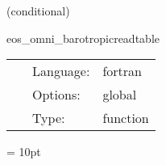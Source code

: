 \vspace{5mm}

   (conditional) 

\hspace{5mm} eos\_omni\_barotropicreadtable 

\hspace{5mm}{\it read barotropic eos ascii table } 


\hspace{5mm}

 \begin{tabular*}{160mm}{cll} 
~ & Language:  & fortran \\ 
~ & Options:  & global \\ 
~ & Type:  & function \\ 
\end{tabular*} 



\vspace{5mm}\parskip = 10pt 

